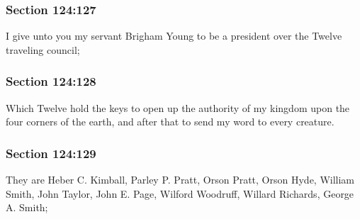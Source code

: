 	\subsubsection{Section 124:127} %
		\label{DC124-127}

		I give unto you my servant Brigham Young to be a president over the Twelve traveling council;


	\subsubsection{Section 124:128} %
		\label{DC124-128}

		Which Twelve hold the keys to open up the authority of my kingdom upon the four corners of the earth, and after that to send my word to every creature.


	\subsubsection{Section 124:129} %
		\label{DC124-129}

		They are Heber C. Kimball, Parley P. Pratt, Orson Pratt, Orson Hyde, William Smith, John Taylor, John E. Page, Wilford Woodruff, Willard Richards, George A. Smith;


